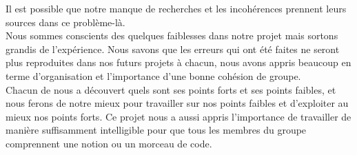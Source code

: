 \documentclass[a4paper,11pt]{article}
\begin{document}
 		Il est possible que notre manque de recherches et les incohérences prennent leurs sources dans ce problème-là.\\
		Nous sommes conscients des quelques faiblesses dans notre projet mais sortons grandis de l’expérience. Nous savons que les erreurs qui ont été faites ne seront plus reproduites dans nos futurs projets à chacun, nous avons appris beaucoup en terme d’organisation et l’importance d’une bonne cohésion de groupe.\\ 
		Chacun de nous a découvert quels sont ses points forts et ses points faibles, et nous ferons de notre mieux pour travailler sur nos points faibles et d’exploiter au mieux nos points forts. Ce projet nous a aussi appris l’importance de travailler de manière suffisamment intelligible pour que tous les membres du groupe comprennent une notion ou un morceau de code.\\
\end{document}
